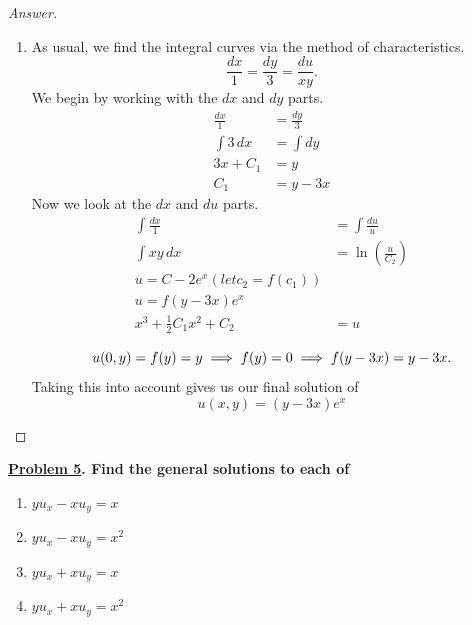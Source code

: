 \documentclass{article}
\theoremstyle{definition}
\renewcommand\qedsymbol{$\blacksquare$}
\newenvironment{ans}{\begin{proof}[Answer]\renewcommand{\qedsymbol}{}}{\end{proof}}
\newenvironment{boldenv}{\bfseries\boldmath}{}
\begin{document}
\begin{ans}
\begin{enumerate}[resume*=answers]
			\item As usual, we find the integral curves via the method of characteristics.
                \[\frac{dx}{1} = \frac{dy}{3} = \frac{du}{xy}.\]
                We begin by working with the $dx$ and $dy$ parts.
                \begin{align*}
                    \frac{dx}{1} &= \frac{dy}{3}\\
                    \int 3\,dx &= \int dy\\
                    3x + C_1 &= y\\
                    C_1 &= y - 3x
                \end{align*}
                Now we look at the $dx$ and $du$ parts.
                \begin{align*}
                    \int \frac{dx}{1} &= \int \frac{du}{u}\\
                    \int xy\,dx &= \ln(\frac{u}{C_2})\\
                    u = C-2e^x (let c_2 = f(c_1))\\
                    u = f(y-3x)e^x\\
                    x^3 + \frac{1}{2}C_1x^2 + C_2 &= u
                \end{align*}

                \begin{equation*}
                    u(0,y) = f(y) = y\\
                    \implies f(y) = 0\\
                    \implies f(y-3x) = y-3x.
                \end{equation*}
                Taking this into account gives us our final solution of
                \[\boxed{u(x,y) = (y-3x)e^x}\]
			
		\end{enumerate}
	\end{ans}
	
	\begin{boldenv}
		\underline{Problem 5}. Find the general solutions to each of
		\begin{enumerate}[resume*=problems]
			\item $yu_x - xu_y = x$
			\item $yu_x - xu_y = x^2$
			\item $yu_x + xu_y = x$
			\item $yu_x + xu_y = x^2$
		\end{enumerate}
	\end{boldenv}
	
\end{document}
